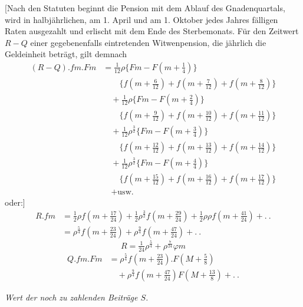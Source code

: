 [Nach den Statuten beginnt die Pension mit dem Ablauf des Gnadenquartals, wird in halbjährlichen, am 1. April und am 1. Oktober jedes Jahres fälligen Raten ausgezahlt und erlischt mit dem Ende des Sterbemonats. Für den Zeitwert \(R-Q\) einer gegebenenfalls eintretenden Witwenpension, die jährlich die Geldeinheit beträgt, gilt demnach
\[
\begin{aligned}
(R-Q)\mathord{.}fm\mathord{.}Fm&=\tfrac{1}{12}\rho\{Fm-F(m+\tfrac{1}{4})\}\\
&\qquad\{f(m+\tfrac{6}{12})+f(m+\tfrac{7}{12})+f(m+\tfrac{8}{12})\}\\
&\quad+\tfrac{1}{12}\rho\{Fm-F(m+\tfrac{2}{4})\}\\
&\qquad\{f(m+\tfrac{9}{12})+f(m+\tfrac{10}{12})+f(m+\tfrac{11}{12})\}\\
&\quad+\tfrac{1}{12}\rho^{\frac{3}{2}}\{Fm-F(m+\tfrac{3}{4})\}\\
&\qquad\{f(m+\tfrac{12}{12})+f(m+\tfrac{13}{12})+f(m+\tfrac{14}{12})\}\\
&\quad+\tfrac{1}{12}\rho^{\frac{3}{2}}\{Fm-F(m+\tfrac{4}{4})\}\\
&\qquad\{f(m+\tfrac{15}{12})+f(m+\tfrac{16}{12})+f(m+\tfrac{17}{12})\}\\
&\quad+\text{usw.}
\end{aligned}
\]
\noindent oder:]
\[
\begin{aligned}
R\mathord{.}fm&=\tfrac{1}{2}\rho f(m+\tfrac{17}{24})+\tfrac{1}{2}\rho^{\frac{3}{2}}f(m+\tfrac{29}{24})+\tfrac{1}{2}\rho\rho f(m+\tfrac{41}{24})+.\ .\\
&=\rho^{\frac{5}{4}}f(m+\tfrac{23}{24})+\rho^{\frac{9}{4}}f(m+\tfrac{47}{24})+.\ .
\end{aligned}
\]
\[
R=\tfrac{1}{24}\rho^{\frac{5}{4}}+\rho^{\frac{7}{24}}\varphi m
\]
\[
\begin{aligned}
Q\mathord{.}fm\mathord{.}Fm&=\rho^{\frac{5}{4}}f(m+\tfrac{23}{24})\mathord{.}F(M+\tfrac{5}{8})\\
&\quad+\rho^{\frac{9}{4}}f(m+\tfrac{47}{24})F(M+\tfrac{13}{8})+.\ .
\end{aligned}
\]
\begin{center}\textit{Wert der noch zu zahlenden Beiträge \(S\).}\end{center}
